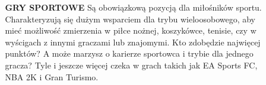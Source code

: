 \documentclass{beamer}
\begin{document}
\begin{frame} %
\begin{columns}
\begin{column}{0.5\textwidth}
    \begin{figure}
    \centering
        \includegraphics[width=4.5cm,height=6cm]{FC25.jpg}
\end{figure}
\end{column}

\begin{column}{0.5\textwidth}
	   \normalsize \textbf {GRY SPORTOWE}
\newline
 \small Są obowiązkową pozycją dla miłośników sportu. Charakteryzują się dużym wsparciem dla trybu wieloosobowego, aby mieć możliwość zmierzenia w piłce nożnej, koszykówce, tenisie, czy w wyścigach z innymi graczami lub znajomymi. Kto zdobędzie najwięcej punktów? A może marzysz o karierze sportowca i trybie dla jednego gracza? Tyle i jeszcze więcej czeka w grach takich jak EA Sports FC, NBA 2K i Gran Turismo. 

\end{column}
\end{columns}
\end{frame}
\end{document}
